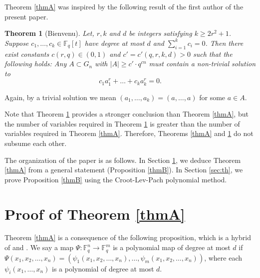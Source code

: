 \documentclass[11pt]{amsart}
\newcommand\Fq{{\mathbb{F}_q}}
\newtheorem{theorem}{Theorem}%
\theoremstyle{definition}
\theoremstyle{remark}
\begin{document}
Theorem \ref{thmA} was inspired by the following result \cite{bienvenu} of the first author of the present paper.

\begin{theorem}[Bienvenu] \label{bi}
	Let, $r, k$ and $d$ be integers satisfying $k\geq 2r^2+1$. Suppose $c_1, \dots, c_k\in \Fq[t]$ have degree at most $d$ and $\sum_{i=1}^k c_i=0$. Then there exist constants $c(r,q)\in(0,1)$ and $c'= c'(q,r,k,d) >0$ such that the following holds: Any $A\subset G_n$ with $|A|\geq c' \cdot q^{cn}$ must contain a non-trivial solution to 
	\begin{equation}\label{ee2}
		c_1 a_1^r+\dots +c_k a_k^r=0.
	\end{equation}
\end{theorem}

Again, by a trivial solution we mean $(a_1,\dots,a_k)=(a,\dots,a)$ for some $a\in A$. 

Note that Theorem \ref{bi} provides a stronger conclusion than Theorem \ref{thmA}, but the number of variables required in Theorem \ref{bi} is greater than the number of variables required in Theorem \ref{thmA}. Therefore, Theorems \ref{thmA} and \ref{bi} do not subsume each other.

The organization of the paper is as follows. In Section \ref{sec:prop}, we deduce Theorem \ref{thmA} from a general statement (Proposition \ref{thmB}). In Section \ref{sec:th}, we prove Proposition \ref{thmB} using the Croot-Lev-Pach polynomial method.

\section{Proof of Theorem \ref{thmA}} \label{sec:prop}

Theorem \ref{thmA} is a consequence of the following proposition, which is a hybrid of \cite[Proposition 2]{bienvenu} and \cite[Theorem 1.3]{green}.
We say a map $\Psi: \mathbb{F}_q^n \rightarrow \mathbb{F}_q^m$ is a polynomial map of degree at most $d$ if $\Psi(x_1, x_2, \ldots, x_{n}) = (\psi_1(x_1, x_2, \ldots, x_{n}), \ldots, \psi_{m}(x_1, x_2, \ldots, x_{n}))$, where each $\psi_i(x_1, \ldots, x_n)$ is a polynomial of degree at most $d$.
\end{document}
